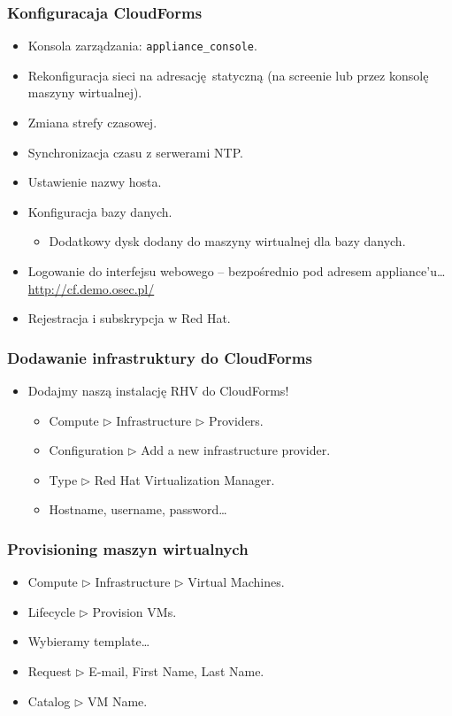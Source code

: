 \documentclass[dvipsnames,table]{beamer}
\newcommand{\tri}{$\triangleright$ }
\begin{document}
\begin{frame}
\frametitle{Konfiguracaja CloudForms}
\begin{itemize}
	\item Konsola zarządzania: {\tt appliance\_console}.
	\item Rekonfiguracja sieci na adresację statyczną (na screenie lub przez konsolę maszyny wirtualnej).
	\item Zmiana strefy czasowej.
	\item Synchronizacja czasu z serwerami NTP.
	\item Ustawienie nazwy hosta.
	\item Konfiguracja bazy danych.
	\begin{itemize}
		\item Dodatkowy dysk dodany do maszyny wirtualnej dla bazy danych.
	\end{itemize}
	\item Logowanie do interfejsu webowego -- bezpośrednio pod adresem appliance'u\ldots \url{http://cf.demo.osec.pl/}
	\item Rejestracja i subskrypcja w Red Hat.
\end{itemize}
\end{frame}

\begin{frame}
\frametitle{Dodawanie infrastruktury do CloudForms}
\begin{itemize}
	\item Dodajmy naszą instalację RHV do CloudForms!
	\begin{itemize}
		\item Compute \tri Infrastructure \tri Providers.
		\item Configuration \tri Add a new infrastructure provider.
		\item Type \tri Red Hat Virtualization Manager.
		\item Hostname, username, password\ldots
	\end{itemize}
\end{itemize}
\end{frame}

\begin{frame}
\frametitle{Provisioning maszyn wirtualnych}
\begin{itemize}
	\item Compute \tri Infrastructure \tri Virtual Machines.
	\item Lifecycle \tri Provision VMs.
	\item Wybieramy template\ldots
	\item Request \tri E-mail, First Name, Last Name.
	\item Catalog \tri VM Name.
\end{itemize}
\end{frame}
\end{document}
